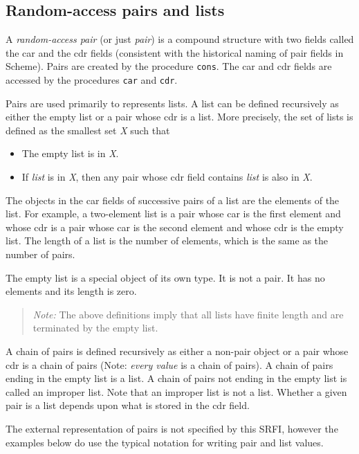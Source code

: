 \subsection{{Random-access pairs and lists}}

A \emph{random-access pair} (or just \emph{pair}) is a compound
structure with two fields called the car and the cdr fields (consistent
with the historical naming of pair fields in Scheme). Pairs are created
by the procedure \texttt{cons}. The car and cdr fields are accessed by
the procedures \texttt{car} and \texttt{cdr}.

Pairs are used primarily to represents lists. A list can be defined
recursively as either the empty list or a pair whose cdr is a list. More
precisely, the set of lists is defined as the smallest set \emph{X} such
that

\begin{itemize}
\tightlist
\item
  The empty list is in \emph{X}.
\item
  If \emph{list} is in \emph{X}, then any pair whose cdr field contains
  \emph{list} is also in \emph{X}.
\end{itemize}

The objects in the car fields of successive pairs of a list are the
elements of the list. For example, a two-element list is a pair whose
car is the first element and whose cdr is a pair whose car is the second
element and whose cdr is the empty list. The length of a list is the
number of elements, which is the same as the number of pairs.

The empty list is a special object of its own type. It is not a pair. It
has no elements and its length is zero.

\begin{quote}
\emph{Note:} The above definitions imply that all lists have finite
length and are terminated by the empty list.
\end{quote}

A chain of pairs is defined recursively as either a non-pair object or a
pair whose cdr is a chain of pairs (Note: \emph{every value} is a chain
of pairs). A chain of pairs ending in the empty list is a list. A chain
of pairs not ending in the empty list is called an improper list. Note
that an improper list is not a list. Whether a given pair is a list
depends upon what is stored in the cdr field.

The external representation of pairs is not specified by this SRFI,
however the examples below do use the typical notation for writing pair
and list values.

